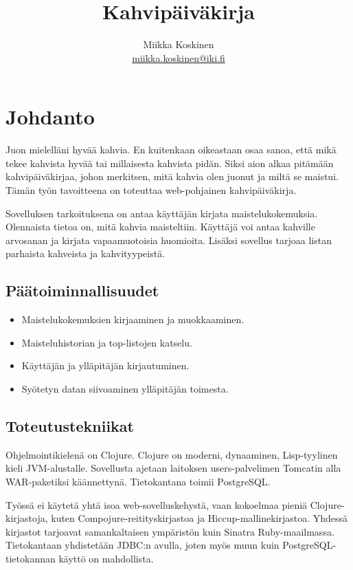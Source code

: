 \documentclass[a4paper,titlepage]{article}
\title{Kahvipäiväkirja}
\author{Miikka Koskinen \\ \url{miikka.koskinen@iki.fi}}
\begin{document}
\maketitle
\tableofcontents
\newpage

\section{Johdanto}

Juon mielelläni hyvää kahvia. En kuitenkaan oikeastaan osaa sanoa, että mikä
tekee kahvista hyvää tai millaisesta kahvista pidän. Siksi aion alkaa pitämään
kahvipäiväkirjaa, johon merkitsen, mitä kahvia olen juonut ja miltä se maistui.
Tämän työn tavoitteena on toteuttaa web-pohjainen kahvipäiväkirja.

Sovelluksen tarkoituksena on antaa käyttäjän kirjata
maistelukokemuksia. Olennaista tietoa on, mitä kahvia
maisteltiin. Käyttäjä voi antaa kahville arvosanan ja kirjata
vapaamuotoisia huomioita. Lisäksi sovellus tarjoaa listan parhaista
kahveista ja kahvityypeistä.

\subsection{Päätoiminnallisuudet}

\begin{itemize}
\item Maistelukokemuksien kirjaaminen ja muokkaaminen.
\item Maisteluhistorian ja top-listojen katselu.
\item Käyttäjän ja ylläpitäjän kirjautuminen.
\item Syötetyn datan siivoaminen ylläpitäjän toimesta.
\end{itemize}

\subsection{Toteutustekniikat}

Ohjelmointikielenä on Clojure. Clojure on moderni, dynaaminen,
Lisp-tyylinen kieli JVM-alustalle. Sovellusta ajetaan laitoksen
users-palvelimen Tomcatin alla WAR-paketiksi käännettynä. Tietokantana
toimii PostgreSQL.

Työssä ei käytetä yhtä isoa web-sovelluskehystä, vaan kokoelmaa pieniä
Clojure-kirjastoja, kuten Compojure-reitityskirjastoa ja
Hiccup-mallinekirjastoa. Yhdessä kirjastot tarjoavat samankaltaisen
ympäristön kuin Sinatra Ruby-maailmassa. Tietokantaan yhdistetään
JDBC:n avulla, joten myös muun kuin PostgreSQL-tietokannan käyttö on
mahdollista.
\end{document}
